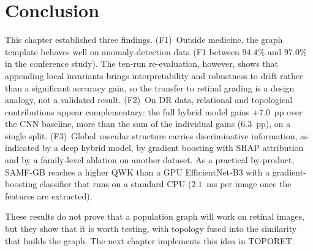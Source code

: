 \section*{Conclusion}

This chapter established three findings. (F1)~Outside medicine, the graph template behaves
well on anomaly-detection data (F1 between $94.4\%$ and $97.0\%$ in the conference study).
The ten-run re-evaluation, however, shows that appending local invariants brings
interpretability and robustness to drift rather than a significant accuracy gain, so the
transfer to retinal grading is a design analogy, not a validated result. (F2)~On DR data,
relational and topological contributions appear complementary: the full hybrid model gains
$+7.0$~pp over the CNN baseline, more than the sum of the individual gains ($6.3$~pp), on a
single split. (F3)~Global vascular structure carries discriminative
information, as indicated by a deep hybrid model, by gradient boosting with SHAP
attribution and by a family-level ablation on another dataset. As a practical by-product,
SAMF-GB reaches a higher QWK than a GPU EfficientNet-B3 with a gradient-boosting classifier
that runs on a standard CPU ($2.1$~ms per image once the features are extracted).

These results do not prove that a population graph will work on retinal images, but they
show that it is worth testing, with topology fused into the similarity that builds the
graph. The next chapter implements this idea in TOPORET.
